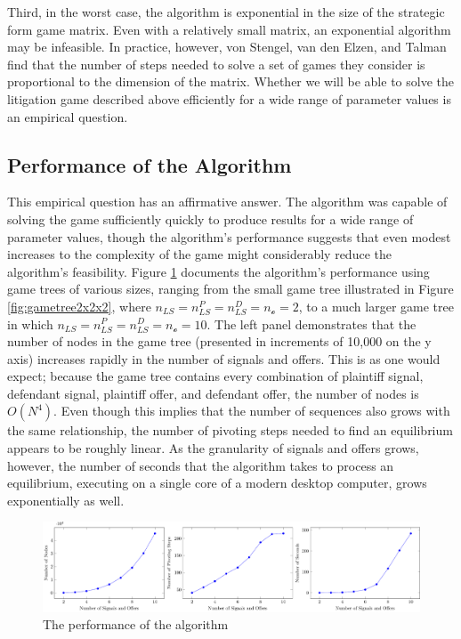 \documentclass{article}
\begin{document}
Third, in the worst case, the algorithm is exponential in the size of the strategic form game matrix. Even with a relatively small matrix, an exponential algorithm may be infeasible. In practice, however, von Stengel, van den Elzen, and Talman find that the number of steps needed to solve a set of games they consider is proportional to the dimension of the matrix. Whether we will be able to solve the litigation game described above efficiently for a wide range of parameter values is an empirical question.

\subsection{Performance of the Algorithm}

This empirical question has an affirmative answer. The algorithm was capable of solving the game sufficiently quickly to produce results for a wide range of parameter values, though the algorithm's performance suggests that even modest increases to the complexity of the game might considerably reduce the algorithm's feasibility.  Figure \ref{fig:performance} documents the algorithm's performance using game trees of various sizes, ranging from the small game tree illustrated in Figure \ref{fig:gametree2x2x2}, where $n_{LS}=n_{LS}^P=n_{LS}^D=n_{\mathcal{o}}=2$, to a much larger game tree in which $n_{LS}=n_{LS}^P=n_{LS}^D=n_{\mathcal{o}}=10$. The left panel demonstrates that the number of nodes in the game tree (presented in increments of 10,000 on the y axis) increases rapidly in the number of signals and offers. This is as one would expect; because the game tree contains every combination of plaintiff signal, defendant signal, plaintiff offer, and defendant offer, the number of nodes is $O(N^4)$. Even though this implies that the number of sequences also grows with the same relationship, the number of pivoting steps needed to find an equilibrium appears to be roughly linear. As the granularity of signals and offers grows, however, the number of seconds that the algorithm takes to process an equilibrium, executing on a single core of a modern desktop computer, grows exponentially as well. 

\begin{figure}[h!]
\centering
\includegraphics[scale=0.40, trim={0in 0in 0in 0in}, clip]{../Figures/ECTA algorithm complexity.pdf}
\caption{The performance of the algorithm}
\label{fig:performance}
\end{figure}
\end{document}

